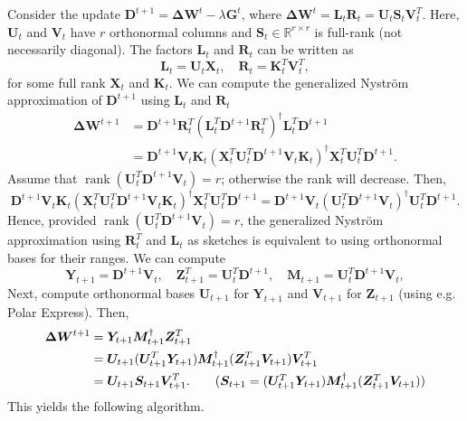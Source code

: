 \documentclass[11pt]{article}
\newcommand{\mat}[1]{\bm{#1}}
\newcommand{\DW}{\mat{\Delta W}}
\DeclareMathOperator{\rank}{rank}
\begin{document}
Consider the update $\bm{D}^{t+1} = \DW^t - \lambda \bm{G}^t$, where $\DW^t = \bm{L}_t \bm{R}_t = \bm{U}_t \bm{S}_t \bm{V}_t^T$. Here, $\bm{U}_t$ and $\bm{V}_t$ have $r$ orthonormal columns and $\bm{S}_t \in \mathbb{R}^{r \times r}$ is full-rank (not necessarily diagonal). The factors $\bm{L}_t$ and $\bm{R}_t$ can be written as
\begin{equation*}
    \bm{L}_t = \bm{U}_t \bm{X}_t, \quad \bm{R}_t = \bm{K}_t^T \bm{V}_t^T,
\end{equation*}
for some full rank $\bm{X}_t$ and $\bm{K}_t$. We can compute the generalized Nyström approximation of $\bm{D}^{t+1}$ using $\bm{L}_t$ and $\bm{R}_t$
\begin{align*}
    \DW^{t+1} &= \bm{D}^{t+1} \bm{R}_t^T (\bm{L}_t^T \bm{D}^{t+1} \bm{R}_t^T)^{\dagger} \bm{L}_t^T \bm{D}^{t+1}\\
    &= \bm{D}^{t+1} \bm{V}_t \bm{K}_t (\bm{X}_t^T \bm{U}_t^T \bm{D}^{t+1} \bm{V}_t \bm{K}_t)^{\dagger} \bm{X}_t^T \bm{U}_t^T \bm{D}^{t+1}.
\end{align*}
Assume that $\rank(\bm{U}_t^T \bm{D}^{t+1} \bm{V}_t) = r$; otherwise the rank will decrease. Then, 
\begin{equation*}
    \bm{D}^{t+1} \bm{V}_t \bm{K}_t (\bm{X}_t^T \bm{U}_t^T \bm{D}^{t+1} \bm{V}_t \bm{K}_t)^{\dagger} \bm{X}_t^T \bm{U}_t^T \bm{D}^{t+1} = \bm{D}^{t+1} \bm{V}_t (\bm{U}_t^T \bm{D}^{t+1} \bm{V}_t)^{\dagger} \bm{U}_t^T \bm{D}^{t+1}.
\end{equation*}
Hence, provided $\rank(\bm{U}_t^T \bm{D}^{t+1} \bm{V}_t) = r$, the generalized Nyström approximation using $\bm{R}_t^T$ and $\bm{L}_t$ as sketches is equivalent to using orthonormal bases for their ranges. We can compute
\begin{equation*}
    \bm{Y}_{t+1} = \bm{D}^{t+1} \bm{V}_{t}, \quad \bm{Z}_{t+1}^T = \bm{U}_{t}^T \bm{D}^{t+1}, \quad \bm{M}_{t+1} = \bm{U}_{t}^T \bm{D}^{t+1}\bm{V}_{t},
\end{equation*}
Next, compute orthonormal bases $\bm{U}_{t+1}$ for $\bm{Y}_{t+1}$ and $\bm{V}_{t+1}$ for $\bm{Z}_{t+1}$ (using e.g. Polar Express). Then,
\begin{align*}
    \DW^{t+1} &= \bm{Y}_{t+1} \bm{M}_{t+1}^{\dagger} \bm{Z}_{t+1}^T\\
    &= \bm{U}_{t+1} (\bm{U}_{t+1}^T \bm{Y}_{t+1})\bm{M}_{t+1}^{\dagger} (\bm{Z}_{t+1}^T\bm{V}_{t+1}) \bm{V}_{t+1}^T\\
    &= \bm{U}_{t+1} \bm{S}_{t+1} \bm{V}_{t+1}^T. \tag{$\bm{S}_{t+1}=(\bm{U}_{t+1}^T \bm{Y}_{t+1})\bm{M}_{t+1}^{\dagger} (\bm{Z}_{t+1}^T\bm{V}_{t+1})$}
\end{align*}
This yields the following algorithm. 
\end{document}
